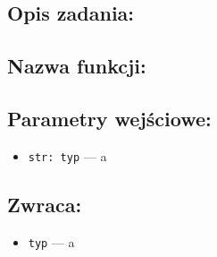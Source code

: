 \sectionZadanie

\subsection*{Opis zadania:}
\subsection*{Nazwa funkcji:}

\subsection*{Parametry wejściowe:}
\begin{itemize}
  \item \texttt{str: typ} — a
\end{itemize}

\subsection*{Zwraca:}
\begin{itemize}
  \item \texttt{typ} — a
\end{itemize}

